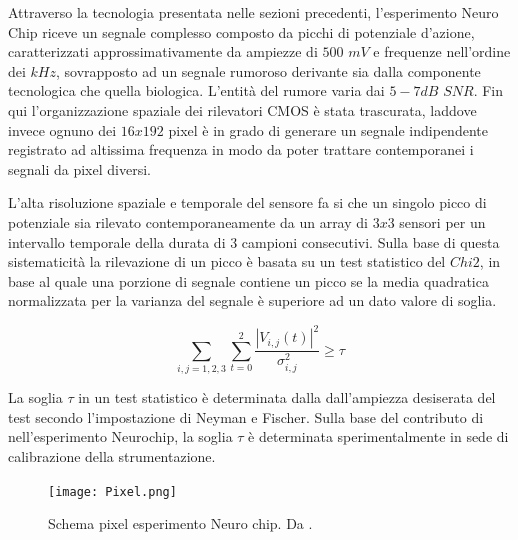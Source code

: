 Attraverso la tecnologia presentata nelle sezioni precedenti, l'esperimento Neuro Chip riceve un segnale complesso composto da picchi di potenziale d'azione, caratterizzati approssimativamente da ampiezze di $500$ $mV$ e frequenze nell'ordine dei $kHz$, sovrapposto ad un segnale rumoroso derivante sia dalla componente tecnologica che quella biologica. L'entità del rumore varia dai $5-7dB$ $SNR$.  Fin qui l'organizzazione spaziale dei rilevatori CMOS è stata trascurata, laddove invece ognuno dei $16x192$ pixel è in grado di generare un segnale indipendente registrato ad altissima frequenza in modo da poter trattare contemporanei i segnali da pixel diversi.

L'alta risoluzione spaziale e temporale del sensore fa si che un singolo picco di potenziale sia rilevato contemporaneamente da un array di $3x3$ sensori per un intervallo temporale della durata di $3$ campioni consecutivi. Sulla base di questa sistematicità la rilevazione di un picco è basata su un test statistico del $Chi2$, in base al quale una porzione di segnale contiene un picco se la media quadratica normalizzata per la varianza del segnale è superiore ad un dato valore di soglia.

\begin{equation}
 \sum_{i,j=1,2,3} \sum_{t=0}^{2} \frac{|V_{i,j}(t)|^{2}}{\sigma_{i,j}^{2}} \geq \tau
\end{equation}

La soglia $\tau$ in un test statistico è determinata dalla dall'ampiezza desiserata del test secondo l'impostazione di Neyman e Fischer. Sulla base del contributo di \cite{Lambacher2011} nell'esperimento Neurochip, la soglia $\tau$ è determinata sperimentalmente in sede di calibrazione della strumentazione.

\begin{figure}%
\centering    
\texttt{[image: Pixel.png]}
\caption[Schema pixel esperimento Neuro chip]
{ Schema pixel esperimento Neuro chip.
Da \cite{Vallicelli2017}. }
\label{fig:Pixel}
\end{figure}
